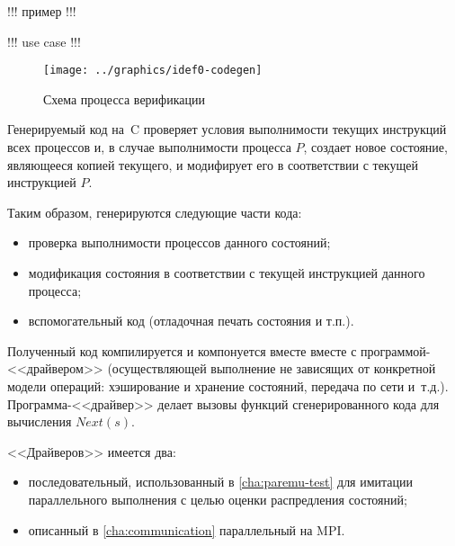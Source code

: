 
!!! пример !!!

!!! use case !!! 

\begin{figure}[ht]
  \centering
  \texttt{[image: ../graphics/idef0-codegen]}  
  \caption{Схема процесса верификации}
\label{fig:idef0-codegen}
\end{figure}

Генерируемый код на~C проверяет условия выполнимости текущих инструкций всех процессов и,
в случае выполнимости процесса $P$, создает новое состояние, являющееся копией текущего, и
модифирует его в соответствии с текущей инструкцией $P$.

Таким образом, генерируются следующие части кода:

\begin{itemize}
\item проверка выполнимости процессов данного состояний;
\item модификация состояния в соответствии с текущей инструкцией данного процесса;
\item вспомогательный код (отладочная печать состояния и т.п.).
\end{itemize}

Полученный код компилируется и компонуется вместе вместе с программой-<<драйвером>>
(осуществляющей выполнение не зависящих от конкретной модели операций: хэширование и
хранение состояний, передача по сети и~т.д.). Программа-<<драйвер>> делает вызовы функций
сгенерированного кода для вычисления $Next(s)$.

<<Драйверов>> имеется два: 

\begin{itemize}
\item последовательный, использованный в \ref{cha:paremu-test} для имитации параллельного
  выполнения с целью оценки распредления состояний;
\item описанный в \ref{cha:communication} параллельный на MPI.
\end{itemize}


